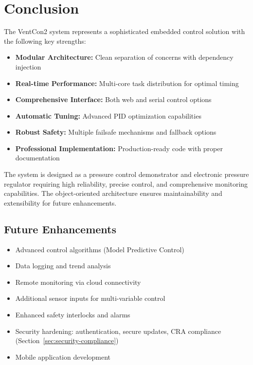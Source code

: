 
\section{Conclusion}

The VentCon2 system represents a sophisticated embedded control solution with the following key strengths:

\begin{itemize}
    \item \textbf{Modular Architecture:} Clean separation of concerns with dependency injection
    \item \textbf{Real-time Performance:} Multi-core task distribution for optimal timing
    \item \textbf{Comprehensive Interface:} Both web and serial control options
    \item \textbf{Automatic Tuning:} Advanced PID optimization capabilities
    \item \textbf{Robust Safety:} Multiple failsafe mechanisms and fallback options
    \item \textbf{Professional Implementation:} Production-ready code with proper documentation
\end{itemize}

The system is designed as a pressure control demonstrator and electronic pressure regulator requiring high reliability, precise control, and comprehensive monitoring capabilities. The object-oriented architecture ensures maintainability and extensibility for future enhancements.

\subsection{Future Enhancements}
\begin{itemize}
    \item Advanced control algorithms (Model Predictive Control)
    \item Data logging and trend analysis
    \item Remote monitoring via cloud connectivity
    \item Additional sensor inputs for multi-variable control
    \item Enhanced safety interlocks and alarms
    \item Security hardening: authentication, secure updates, CRA compliance (Section~\ref{sec:security-compliance})
    \item Mobile application development
\end{itemize}
